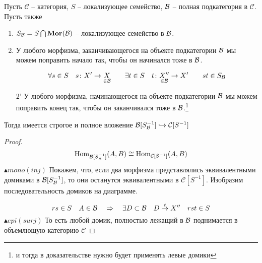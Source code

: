 \documentclass[../main.tex]{subfiles}
\begin{document}
\begin{to_lem}
\label{AB}
Пусть $\mathcal{C}$ -- категория, $S$ -- локализующее семейство, $\mathcal{B}$ -- полная подкатегория в $\mathcal{C}$.  Пусть также 
\begin{enumerate}
    \item $S_{\mathcal{B}} = S \bigcap \mathbf{Mor}(\mathcal{B})$ -- локализующее семейство в $\mathcal{B}$.
    \item У любого морфизма, заканчивающегося на объекте подкатегории $\mathcal{B}$ мы можем поправить начало так, чтобы он начинался тоже в $\mathcal{B}$.
    \bee
    \eee
    \[\forall s \in S \quad s \colon X' \to \underset{\in \mathcal{B}}{X} \qquad \exists t \in S \quad t \colon \underset{\in \mathcal{B}}{X''} \to X' \qquad st \in S_{\mathcal{B}}\]
    \item[2'] У любого морфизма, начинающегося на объекте подкатегории $\mathcal{B}$ мы можем поправить конец так, чтобы он заканчивался тоже в $\mathcal{B}$.\footnote{и тогда в доказательстве нужно будет применять левые домики}
    \bee
    \eee
\end{enumerate}
Тогда имеется строгое и полное вложение $\mathcal{B}[S_{\mathcal{B}}^{-1}] \hookrightarrow \mathcal{C}[S^{-1}]$
\end{to_lem}
\begin{proof}
    \[\operatorname{Hom}_{\mathcal{B}[S_{\mathcal{B}}^{-1}]} (A, B) \cong \operatorname{Hom}_{\mathcal{C}[S^{-1}]}(A, B) \]
    $\blacktriangle mono(inj)$ Покажем, что, если два морфизма представлялись эквивалентными домиками в $\mathcal{B}[S_{\mathcal{B}}^{-1}]$, то они останутся эквивалентными в $\mathcal{C}[S^{-1}]$. Изобразим последовательность домиков на диаграмме.
    \bee
    \eee
    \[rs \in S \quad A \in \mathcal{B} \quad \Rightarrow \quad \exists D \subset \mathcal{B} \quad D \overset{t}{\to}X'' \quad rst \in S \]
    $\blacktriangle epi(surj)$ То есть любой домик, полностью лежащий в $\mathcal{B}$ поднимается в объемлющую категорию $\mathcal{C}$
    \bee
    \eee
\end{proof}
\end{document}
